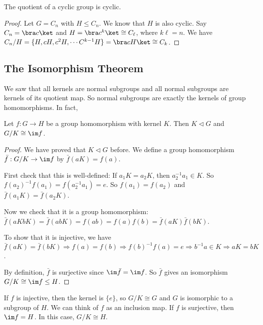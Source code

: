 \documentclass[a4pape]{article}
\begin{document}
\begin{prop}
  The quotient of a cyclic group is cyclic.
\end{prop}

\begin{proof}
  Let $G = C_n$ with $H\leq C_n$. We know that $H$ is also cyclic. Say $C_n = \bra c\ket$ and $H = \bra c^k \ket \cong C_\ell$, where $k\ell = n$. We have $C_n/H = \{H, cH, c^2H, \cdots C^{k - 1}H\}=\bra cH\ket \cong C_k$.
\end{proof}

\subsection{The Isomorphism Theorem}
We saw that all kernels are normal subgroups and all normal subgroups are kernels of its quotient map. So normal subgroups are exactly the kernels of group homomorphisms. In fact,
\begin{thm}
  Let $f:G\to H$ be a group homomorphism with kernel $K$. Then $K\lhd G$ and $G/K\cong \im f$.
\end{thm}

\begin{proof}
  We have proved that $K\lhd G$ before. We define a group homomorphism $\bar f: G/K\to \im f$ by $\bar f(aK) = f(a)$.

First check that this is well-defined: If $a_1K = a_2K$, then $a_2^{-1}a_1\in K$. So $f(a_2)^{-1}f(a_1) = f(a_2^{-1}a_1) = e$. So $f(a_1) = f(a_2)$ and $\bar f(a_1K) = \bar f(a_2 K)$.

Now we check that it is a group homomorphism: $\bar f(aKbK) = \bar f(abK) = f(ab) = f(a)f(b) = \bar f(aK) \bar f(bK)$.

To show that it is injective, we have $\bar f(aK) = \bar f(bK) \Rightarrow f(a) = f(b) \Rightarrow f(b)^{-1}f(a)=e\Rightarrow b^{-1}a\in K \Rightarrow aK = bK$.

By definition, $\bar f$ is surjective since $\im \bar f = \im f$. So $\bar f$ gives an isomorphism $G/K \cong \im f \leq H$.
\end{proof}
\note If $f$ is injective, then the kernel is $\{e\}$, so $G/K\cong G$ and $G$ is isomorphic to a subgroup of $H$. We can think of $f$ as an inclusion map.
\note If $f$ is surjective, then $\im f = H$. In this case, $G/K \cong H$.
\end{document}

